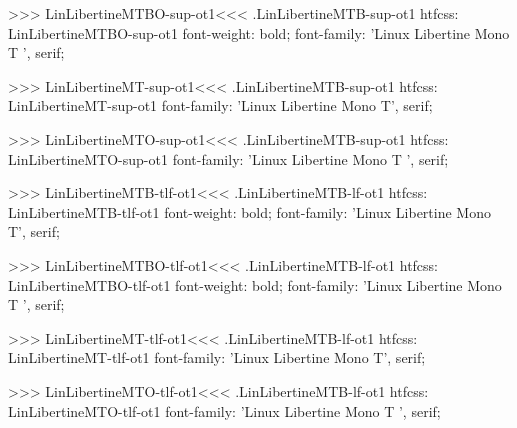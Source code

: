 {{{>>>
\<LinLibertineMTBO-sup-ot1\><<<
.LinLibertineMTB-sup-ot1
htfcss:  LinLibertineMTBO-sup-ot1  font-weight: bold; font-family: 'Linux Libertine Mono T ', serif;

>>>
\<LinLibertineMT-sup-ot1\><<<
.LinLibertineMTB-sup-ot1
htfcss:  LinLibertineMT-sup-ot1  font-family: 'Linux Libertine Mono T', serif;

>>>
\<LinLibertineMTO-sup-ot1\><<<
.LinLibertineMTB-sup-ot1
htfcss:  LinLibertineMTO-sup-ot1  font-family: 'Linux Libertine Mono T ', serif;

>>>
\<LinLibertineMTB-tlf-ot1\><<<
.LinLibertineMTB-lf-ot1
htfcss:  LinLibertineMTB-tlf-ot1  font-weight: bold; font-family: 'Linux Libertine Mono T', serif;

>>>
\<LinLibertineMTBO-tlf-ot1\><<<
.LinLibertineMTB-lf-ot1
htfcss:  LinLibertineMTBO-tlf-ot1  font-weight: bold; font-family: 'Linux Libertine Mono T ', serif;

>>>
\<LinLibertineMT-tlf-ot1\><<<
.LinLibertineMTB-lf-ot1
htfcss:  LinLibertineMT-tlf-ot1  font-family: 'Linux Libertine Mono T', serif;

>>>
\<LinLibertineMTO-tlf-ot1\><<<
.LinLibertineMTB-lf-ot1
htfcss:  LinLibertineMTO-tlf-ot1  font-family: 'Linux Libertine Mono T ', serif;

}}}
